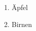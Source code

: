 \documentclass{article}
\begin{document}
  \begin{enumerate}
    \item Äpfel
    \item Birnen
  \end{enumerate}
\end{document}
